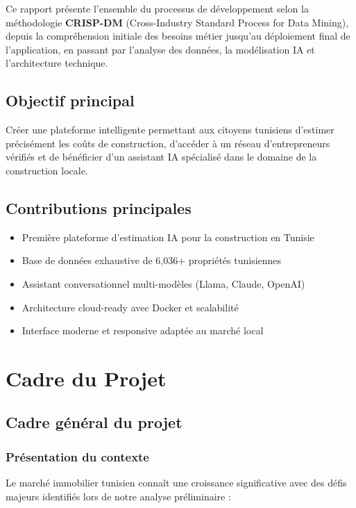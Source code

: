 \documentclass[12pt,a4paper]{report}
\begin{document}
Ce rapport présente l'ensemble du processus de développement selon la méthodologie \textbf{CRISP-DM} (Cross-Industry Standard Process for Data Mining), depuis la compréhension initiale des besoins métier jusqu'au déploiement final de l'application, en passant par l'analyse des données, la modélisation IA et l'architecture technique.

\section*{Objectif principal}
Créer une plateforme intelligente permettant aux citoyens tunisiens d'estimer précisément les coûts de construction, d'accéder à un réseau d'entrepreneurs vérifiés et de bénéficier d'un assistant IA spécialisé dans le domaine de la construction locale.

\section*{Contributions principales}
\begin{itemize}
    \item Première plateforme d'estimation IA pour la construction en Tunisie
    \item Base de données exhaustive de 6,036+ propriétés tunisiennes
    \item Assistant conversationnel multi-modèles (Llama, Claude, OpenAI)
    \item Architecture cloud-ready avec Docker et scalabilité
    \item Interface moderne et responsive adaptée au marché local
\end{itemize}

\chapter{Cadre du Projet}

\section{Cadre général du projet}

\subsection{Présentation du contexte}

Le marché immobilier tunisien connaît une croissance significative avec des défis majeurs identifiés lors de notre analyse préliminaire :
\end{document}
